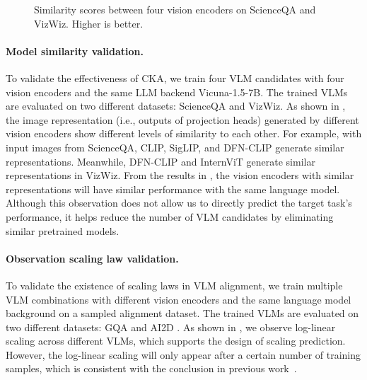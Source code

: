 \begin{figure}[!t]
\centering
\caption{Similarity scores between four vision encoders on ScienceQA and VizWiz. Higher is better. 
}
\label{fig:model_similarity}
\vspace{-4mm}
\end{figure}

\paragraph{Model similarity validation.} 
To validate the effectiveness of CKA, we train four VLM candidates with four vision encoders and the same LLM backend Vicuna-1.5-7B. The trained VLMs are evaluated on two different datasets: ScienceQA and VizWiz. As shown in , the image representation (i.e., outputs of projection heads) generated by different vision encoders show different levels of similarity to each other. For example, with input images from ScienceQA, CLIP, SigLIP, and DFN-CLIP generate similar representations. Meanwhile, DFN-CLIP and InternViT generate similar representations in VizWiz. 
From the results in , the vision encoders with similar representations will have similar performance with the same language model. Although this observation does not allow us to directly predict the target task's performance, it helps reduce the number of VLM candidates by eliminating similar pretrained models.    


\paragraph{Observation scaling law validation.}
To validate the existence of scaling laws in VLM alignment, we train multiple VLM combinations with different vision encoders and the same language model background on a sampled alignment dataset. The trained VLMs are evaluated on two different datasets: GQA and AI2D . As shown in , we observe log-linear scaling across different VLMs, which supports the design of scaling prediction. However, the log-linear scaling will only appear after a certain number of training samples, which is consistent with the conclusion in previous work~\cite{lin2024selecting,ruan2024observational}.


